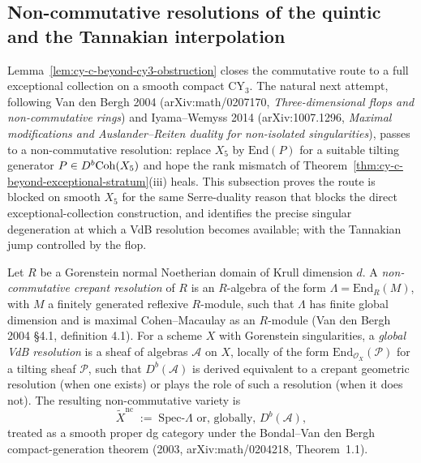 \subsection{Non-commutative resolutions of the quintic and the Tannakian interpolation}
\label{subsec:cy-c-beyond-nc-resolution-quintic}

Lemma~\ref{lem:cy-c-beyond-cy3-obstruction} closes the commutative route
to a full exceptional collection on a smooth compact CY$_3$. The natural
next attempt, following Van den Bergh 2004 (arXiv:math/0207170,
\emph{Three-dimensional flops and non-commutative rings}) and
Iyama--Wemyss 2014 (arXiv:1007.1296, \emph{Maximal modifications and
Auslander--Reiten duality for non-isolated singularities}), passes to a
non-commutative resolution: replace $X_5$ by $\mathrm{End}(P)$ for a
suitable tilting generator $P \in D^b\mathrm{Coh}(X_5)$ and hope the rank
mismatch of
Theorem~\ref{thm:cy-c-beyond-exceptional-stratum}(iii) heals. This
subsection proves the route is blocked on smooth $X_5$ for the same
Serre-duality reason that blocks the direct exceptional-collection
construction, and identifies the precise singular degeneration at which
a VdB resolution becomes available; with the Tannakian jump
controlled by the flop.

\begin{definition}
\label{def:cy-c-beyond-vdb-ncres}
Let $R$ be a Gorenstein normal Noetherian domain of Krull dimension
$d$. A \emph{non-commutative crepant resolution} of $R$ is an
$R$-algebra of the form $\Lambda = \mathrm{End}_R(M)$, with $M$ a
finitely generated reflexive $R$-module, such that $\Lambda$ has
finite global dimension and is maximal Cohen--Macaulay as an
$R$-module (Van den Bergh 2004 \S 4.1, definition 4.1).
For a scheme $X$ with Gorenstein singularities, a \emph{global VdB
resolution} is a sheaf of algebras $\mathcal A$ on $X$, locally of the
form $\mathrm{End}_{\mathcal O_X}(\mathcal P)$ for a tilting sheaf
$\mathcal P$, such that $D^b(\mathcal A)$ is derived equivalent to a
crepant geometric resolution (when one exists) or plays the role of
such a resolution (when it does not). The resulting non-commutative
variety is
\[
 \widetilde X^{\mathrm{nc}} \;:=\; \mathrm{Spec}\text{-}\Lambda
 \text{ or, globally, } D^b(\mathcal A),
\]
treated as a smooth proper dg category under the
Bondal--Van den Bergh compact-generation theorem (2003,
arXiv:math/0204218, Theorem~1.1).
\end{definition}

